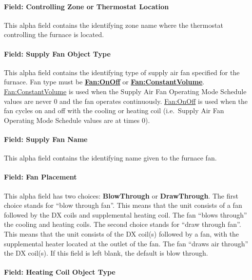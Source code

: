 \paragraph{Field: Controlling Zone or Thermostat Location}\label{field-controlling-zone-or-thermostat-location-1}

This alpha field contains the identifying zone name where the thermostat controlling the furnace is located.

\paragraph{Field: Supply Fan Object Type}\label{field-supply-fan-object-type-1}

This alpha field contains the identifying type of supply air fan specified for the furnace. Fan type must be \textbf{\hyperref[fanonoff]{Fan:OnOff}} or \textbf{\hyperref[fanconstantvolume]{Fan:ConstantVolume}}. \hyperref[fanconstantvolume]{Fan:ConstantVolume} is used when the Supply Air Fan Operating Mode Schedule values are never 0 and the fan operates continuously. \hyperref[fanonoff]{Fan:OnOff} is used when the fan cycles on and off with the cooling or heating coil (i.e.~Supply Air Fan Operating Mode Schedule values are at times 0).

\paragraph{Field: Supply Fan Name}\label{field-supply-fan-name-1}

This alpha field contains the identifying name given to the furnace fan.

\paragraph{Field: Fan Placement}\label{field-fan-placement-1}

This alpha field has two choices: \textbf{BlowThrough} or \textbf{DrawThrough}. The first choice stands for ``blow through fan''. This means that the unit consists of a fan followed by the DX coils and supplemental heating coil. The fan ``blows through'' the cooling and heating coils. The second choice stands for ``draw through fan''. This means that the unit consists of the DX coil(s) followed by a fan, with the supplemental heater located at the outlet of the fan. The fan ``draws air through'' the DX coil(s). If this field is left blank, the default is blow through.

\paragraph{Field: Heating Coil Object Type}\label{field-heating-coil-object-type-1-000}

